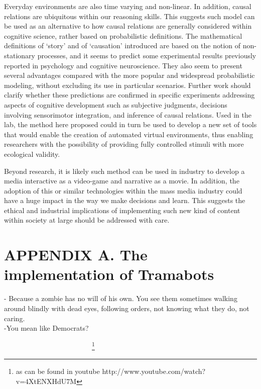\documentclass[
		twoside,openright,titlepage,numbers=noenddot,manychapters,
		headinclude,%
                footinclude=false,cleardoublepage=empty,
                BCOR=5mm,
		fontsize=11pt, %
                 enabledeprecatedfontcommands]{scrreprt}
\begin{document}
Everyday environments are also time varying and non-linear. In addition, causal relations are ubiquitous within our reasoning skills. This suggests such model can be used as an alternative to how causal relations are generally considered within cognitive science, rather based on probabilistic definitions. 
The mathematical definitions of `story' and of `causation' introduced are based on the notion of non-stationary processes, and it seems to predict some experimental results previously reported in psychology and cognitive neuroscience. They also seem to present several advantages compared with the more popular and widespread probabilistic modeling, without excluding its use in particular scenarios. Further work should clarify whether these predictions are confirmed in specific experiments addressing aspects of cognitive development such as subjective judgments, decisions involving sensorimotor integration, and inference of causal relations.
Used in the lab, the method here proposed could in turn be used to develop a new set of tools that would enable the creation of automated virtual environments, thus enabling researchers with the possibility of providing fully controlled stimuli with more ecological validity. 


Beyond research, it is likely such method can be used in industry to develop a media interactive as a video-game and narrative as a movie. In addition, the adoption of this or similar technologies within the mass media industry could have a huge impact in the way we make decisions and learn. This suggests the ethical and industrial implications of implementing such new kind of content within society at large should be addressed with care.




\cleardoublepage


\appendix


\chapter{APPENDIX A. The implementation of  Tramabots}
\thispagestyle{empty}
\label{tramabot}

\begin{origquote}
- Because a zombie has no will of his own. You see them sometimes walking around blindly with dead eyes, following orders, not knowing what they do, not caring.\\
-You mean like Democrats? 

\ \ \ \ \ \ \ \ \ \ \ \ \ \ \ \ \ \ \ \ \ \ \ \ \ \cite{zombies}\footnote{as can be found in youtube http://www.youtube.com/watch?v=4XtENXHdU7M}
\end{origquote}
\end{document}
